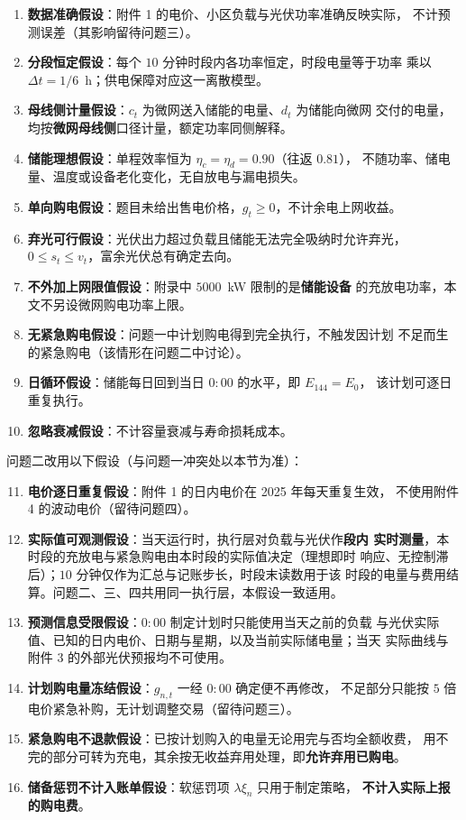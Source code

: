 \documentclass[withoutpreface,bwprint]{cumcmthesis}
\begin{document}
\begin{enumerate}
  \item \textbf{数据准确假设}：附件 1 的电价、小区负载与光伏功率准确反映实际，
        不计预测误差（其影响留待问题三）。
  \item \textbf{分段恒定假设}：每个 $10$ 分钟时段内各功率恒定，时段电量等于功率
        乘以 $\Delta t = 1/6$~h；供电保障对应这一离散模型。
  \item \textbf{母线侧计量假设}：$c_t$ 为微网送入储能的电量、$d_t$ 为储能向微网
        交付的电量，均按\textbf{微网母线侧}口径计量，额定功率同侧解释。
  \item \textbf{储能理想假设}：单程效率恒为 $\eta_c=\eta_d=0.90$（往返 $0.81$），
        不随功率、储电量、温度或设备老化变化，无自放电与漏电损失。
  \item \textbf{单向购电假设}：题目未给出售电价格，$g_t \ge 0$，不计余电上网收益。
  \item \textbf{弃光可行假设}：光伏出力超过负载且储能无法完全吸纳时允许弃光，
        $0 \le s_t \le v_t$，富余光伏总有确定去向。
  \item \textbf{不外加上网限值假设}：附录中 $5000$~kW 限制的是\textbf{储能设备}
        的充放电功率，本文不另设微网购电功率上限。
  \item \textbf{无紧急购电假设}：问题一中计划购电得到完全执行，不触发因计划
        不足而生的紧急购电（该情形在问题二中讨论）。
  \item \textbf{日循环假设}：储能每日回到当日 $0{:}00$ 的水平，即 $E_{144}=E_0$，
        该计划可逐日重复执行。
  \item \textbf{忽略衰减假设}：不计容量衰减与寿命损耗成本。
\end{enumerate}

问题二改用以下假设（与问题一冲突处以本节为准）：

\begin{enumerate}
  \setcounter{enumi}{10}
  \item \textbf{电价逐日重复假设}：附件 1 的日内电价在 2025 年每天重复生效，
        不使用附件 4 的波动电价（留待问题四）。
  \item \textbf{实际值可观测假设}：当天运行时，执行层对负载与光伏作\textbf{段内
        实时测量}，本时段的充放电与紧急购电由本时段的实际值决定（理想即时
        响应、无控制滞后）；$10$ 分钟仅作为汇总与记账步长，时段末读数用于该
        时段的电量与费用结算。问题二、三、四共用同一执行层，本假设一致适用。
  \item \textbf{预测信息受限假设}：$0{:}00$ 制定计划时只能使用当天之前的负载
        与光伏实际值、已知的日内电价、日期与星期，以及当前实际储电量；当天
        实际曲线与附件 3 的外部光伏预报均不可使用。
  \item \textbf{计划购电量冻结假设}：$g_{n,t}$ 一经 $0{:}00$ 确定便不再修改，
        不足部分只能按 $5$ 倍电价紧急补购，无计划调整交易（留待问题三）。
  \item \textbf{紧急购电不退款假设}：已按计划购入的电量无论用完与否均全额收费，
        用不完的部分可转为充电，其余按无收益弃用处理，即\textbf{允许弃用已购电}。
  \item \textbf{储备惩罚不计入账单假设}：软惩罚项 $\lambda\xi_n$ 只用于制定策略，
        \textbf{不计入实际上报的购电费}。
\end{enumerate}
\end{document}

